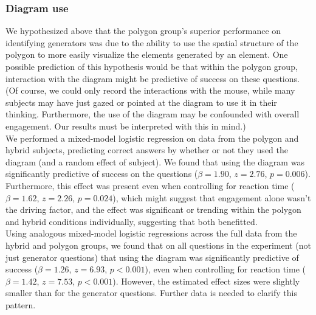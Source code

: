 \documentclass[11pt]{article}
\begin{document}
\subsubsection{Diagram use}
We hypothesized above that the polygon group's superior performance on identifying generators was due to the ability to use the spatial structure of the polygon to more easily visualize the elements generated by an element. One possible prediction of this hypothesis would be that within the polygon group, interaction with the diagram might be predictive of success on these questions. (Of course, we could only record the interactions with the mouse, while many subjects may have just gazed or pointed at the diagram to use it in their thinking. Furthermore, the use of the diagram may be confounded with overall engagement. Our results must be interpreted with this in mind.) \\[11pt]
We performed a mixed-model logistic regression on data from the polygon and hybrid subjects, predicting correct answers by whether or not they used the diagram (and a random effect of subject). We found that using the diagram was significantly predictive of success on the questions ($\beta=1.90$, $z = 2.76$, $p = 0.006$). Furthermore, this effect was present even when controlling for reaction time ($\beta = 1.62$, $z = 2.26$, $p = 0.024$), which might suggest that engagement alone wasn't the driving factor, and the effect was significant or trending within the polygon and hybrid conditions individually, suggesting that both benefitted. \\[11pt]
Using analogous mixed-model logistic regressions across the full data from the hybrid and polygon groups, we found that on all questions in the experiment (not just generator questions) that using the diagram was significantly predictive of success ($\beta = 1.26$, $z = 6.93$, $p < 0.001$), even when controlling for reaction time ($\beta = 1.42$, $z = 7.53$, $p < 0.001$). However, the estimated effect sizes were slightly smaller than for the generator questions. Further data is needed to clarify this pattern.
\end{document}
